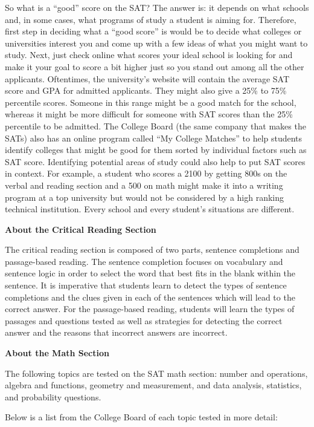 \documentclass[12pt]{book}
\begin{document}
\bigskip
So what is a “good” score on the SAT? The answer is: it depends on what schools and, in some cases, what programs of study a student is aiming for. Therefore, first step in deciding what a “good score” is would be to decide what colleges or universities interest you and come up with a few ideas of what you might want to study. Next, just check online what scores your ideal school is looking for and make it your goal to score a bit higher just so you stand out among all the other applicants. Oftentimes, the university's website will contain the average SAT score and GPA for admitted applicants. They might also give a 25\% to 75\% percentile scores. Someone in this range might be a good match for the school, whereas it might be more difficult for someone with SAT scores than the 25\% percentile to be admitted. The College Board (the same company that makes the SATs) also has an online program called ``My College Matches'' to help students identify colleges that might be good for them sorted by individual factors such as SAT score. Identifying potential areas of study could also help to put SAT scores in context. For example, a student who scores a 2100 by getting 800s on the verbal and reading section and a 500 on math might make it into a writing program at a top university but would not be considered by a high ranking technical institution. Every school and every student's situations are different.

\newpage
\textbf{\large About the Critical Reading Section}

The critical reading section is composed of two parts, sentence completions and passage-based reading. The sentence completion focuses on vocabulary and sentence logic in order to select the word that best fits in the blank within the sentence. It is imperative that students learn to detect the types of sentence completions and the clues given in each of the sentences which will lead to the correct answer. For the passage-based reading, students will learn the types of passages and questions tested as well as strategies for detecting the correct answer and the reasons that incorrect answers are incorrect.

\bigskip
\textbf{\large About the Math Section}

The following topics are tested on the SAT math section: number and operations, algebra and functions, geometry and measurement, and data analysis, statistics, and probability questions. 

\bigskip
Below is a list from the College Board of each topic tested in more detail:
\end{document}
